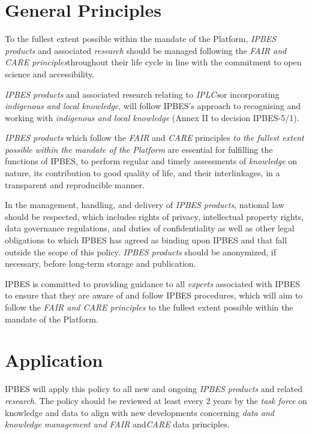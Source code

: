 \documentclass{article}
\begin{document}
\section*{General Principles}

To the fullest extent possible within the mandate of the Platform, \textit{IPBES products} and associated \textit{research} should be managed following the \textit{FAIR and CARE principles}throughout their life cycle in line with the commitment to open science and accessibility.

\textit{IPBES products} and associated research relating to \textit{IPLCs}or incorporating \textit{indigenous and local knowledge}, will follow IPBES’s approach to recognising and working with \textit{indigenous and local knowledge }(Annex II to decision IPBES-5/1).

\textit{IPBES products} which follow the \textit{FAIR }and\textit{ CARE }principles \textit{to the fullest extent possible within the mandate of the Platform} are essential for fulfilling the functions of IPBES, to perform regular and timely assessments of \textit{knowledge} on nature, its contribution to good quality of life, and their interlinkages, in a transparent and reproducible manner.

In the management, handling, and delivery of \textit{IPBES products}, national law should be respected, which includes rights of privacy, intellectual property rights, data governance regulations, and duties of confidentiality as well as other legal obligations to which IPBES has agreed as binding upon IPBES and that fall outside the scope of this policy. \textit{IPBES products }should be anonymized, if necessary, before long-term storage and publication.

IPBES is committed to providing guidance to all \textit{experts }associated with IPBES to ensure that they are aware of and follow IPBES procedures, which will aim to follow the \textit{FAIR and CARE principles} to the fullest extent possible within the mandate of the Platform.

\section*{Application}

IPBES will apply this policy to all new and ongoing \textit{IPBES products} and related \textit{research}. The policy should be reviewed at least every 2 years by the \textit{task force }on knowledge and data to align with new developments concerning \textit{data and knowledge management and} \textit{FAIR }and\textit{CARE }data principles. 
\end{document}
